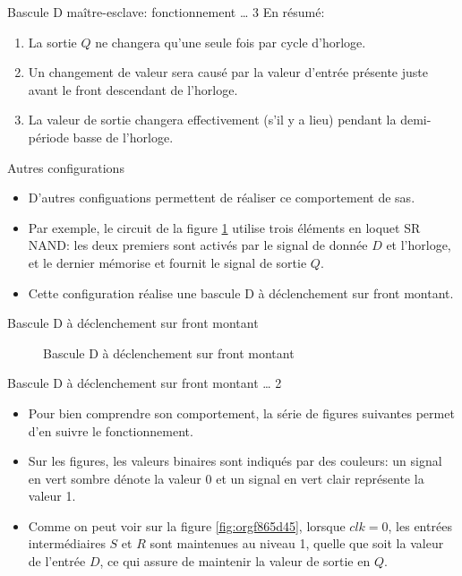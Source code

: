 \documentclass[presentation]{beamer}
\begin{document}
\begin{frame}[label={sec:orgbba4af7}]{Bascule D maître-esclave: fonctionnement \ldots{} 3}
En résumé:

\begin{enumerate}
\item La sortie \(Q\) ne changera qu'une seule fois par cycle d'horloge.
\item Un changement de valeur sera causé par la valeur d'entrée présente
juste avant le front descendant de l'horloge.
\item La valeur de sortie changera effectivement (s'il y a lieu) pendant
la demi-période basse de l'horloge.
\end{enumerate}
\end{frame}

\begin{frame}[label={sec:orgd6b8824}]{Autres configurations}
\begin{itemize}
\item D'autres configuations permettent de réaliser ce comportement de sas.

\item Par exemple, le circuit de la figure \ref{fig:org47f3cb0} utilise trois éléments en loquet SR NAND: les deux premiers sont activés par le signal de donnée \(D\) et l'horloge, et le dernier mémorise et fournit le signal de sortie \(Q\).

\item Cette configuration réalise une bascule D à déclenchement sur front montant.
\end{itemize}
\end{frame}

\begin{frame}[label={sec:org3bb705c}]{Bascule D à déclenchement sur front montant}
\begin{figure}[htbp]
\centering

\caption{\label{fig:org47f3cb0}Bascule D à déclenchement sur front montant}
\end{figure}
\end{frame}

\begin{frame}[label={sec:org30d2000}]{Bascule D à déclenchement sur front montant \ldots{} 2}
\begin{itemize}
\item Pour bien comprendre son comportement, la série de figures suivantes permet d'en suivre le fonctionnement.

\item Sur les figures, les valeurs binaires sont indiqués par des couleurs: un signal en vert sombre dénote la valeur 0 et un signal en vert clair représente la valeur 1.

\item Comme on peut voir sur la figure \ref{fig:orgf865d45}, lorsque \(clk = 0\), les entrées intermédiaires \(S\) et \(R\) sont maintenues au niveau 1, quelle que soit la valeur de l'entrée \(D\), ce qui assure de maintenir la valeur de sortie en \(Q\).
\end{itemize}
\end{frame}
\end{document}
